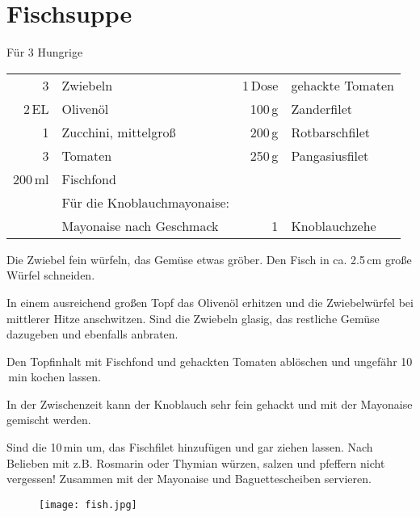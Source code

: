 \section*{Fischsuppe}
\begin{centering}
F\"{u}r 3 Hungrige
\end{centering}
\begin{table}[H]
\centering
\begin{tabular*}{1\textwidth}{rlrl}
3 & Zwiebeln & 1\,Dose & gehackte Tomaten\\
2\,EL & Olivenöl &100\,g & Zanderfilet\\
1 & Zucchini, mittelgroß & 200\,g & Rotbarschfilet\\
3 & Tomaten & 250\,g & Pangasiusfilet\\
200\,ml & Fischfond && \\
&Für die Knoblauchmayonaise:&&\\
& Mayonaise nach Geschmack & 1 & Knoblauchzehe\\
\end{tabular*}
\end{table}
\begin{Notes}
\item Die Zwiebel fein w\"{u}rfeln, das Gem\"{u}se etwas gr\"{o}ber. Den Fisch
  in ca. 2.5\,cm gro{\ss}e W\"{u}rfel schneiden. 
\item In einem ausreichend gro{\ss}en Topf das Oliven\"{o}l erhitzen und die
  Zwiebelw\"{u}rfel bei mittlerer Hitze anschwitzen. Sind die Zwiebeln glasig,
  das restliche Gem\"{u}se dazugeben und ebenfalls anbraten. 
\item Den Topfinhalt mit Fischfond und gehackten Tomaten abl\"{o}schen und
  ungef\"{a}hr 10 \,min kochen lassen. 
\item In der Zwischenzeit kann der Knoblauch sehr fein gehackt und mit der
  Mayonaise gemischt werden. 
\item Sind die 10\,min um, das Fischfilet hinzuf\"{u}gen und gar ziehen lassen.
  Nach Belieben mit z.B. Rosmarin oder Thymian w\"{u}rzen, salzen und pfeffern
  nicht vergessen!
  Zusammen mit der Mayonaise und Baguettescheiben servieren.
\end{Notes}
\vfill
\begin{figure}[H]
  \centering
  \texttt{[image: fish.jpg]}
\end{figure}
\newpage

